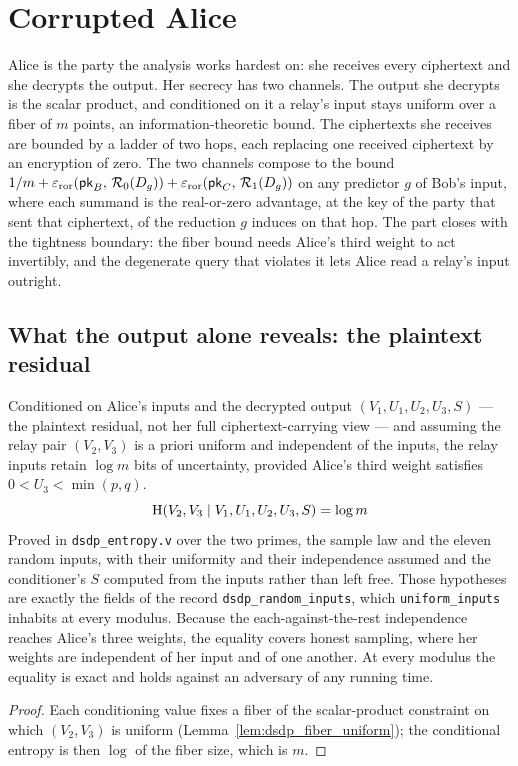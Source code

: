 \part{Corrupted Alice}

Alice is the party the analysis works hardest on: she receives every ciphertext
and she decrypts the output. Her secrecy has two channels. The output she decrypts
is the scalar product, and conditioned on it a relay's input stays uniform over a
fiber of $m$ points, an information-theoretic bound. The ciphertexts she receives
are bounded by a ladder of two hops, each replacing one received ciphertext by an
encryption of zero. The two channels compose to the bound
$1/m + \varepsilon_{\mathrm{ror}}(\mathsf{pk}_B,\,\mathcal{R}_{0}(D_g)) + \varepsilon_{\mathrm{ror}}(\mathsf{pk}_C,\,\mathcal{R}_{1}(D_g))$ on any predictor $g$ of Bob's input, where each summand is
the real-or-zero advantage, at the key of the party that sent that ciphertext, of
the reduction $g$ induces on that hop. The part closes with the tightness
boundary: the fiber bound needs Alice's third weight to act invertibly, and the
degenerate query that violates it lets Alice read a relay's input outright.

\chapter{What the output alone reveals: the plaintext residual}

\begin{theorem}
  \label{thm:dsdp_centropy_uniform}
  \rocqok
  Conditioned on Alice's inputs and the decrypted output $(V_1,U_1,U_2,U_3,S)$ ---
  the plaintext residual, not her full ciphertext-carrying view --- and assuming
  the relay pair $(V_2,V_3)$ is a priori uniform and independent of the inputs, the
  relay inputs retain $\log m$ bits of uncertainty, provided Alice's third weight
  satisfies $0 < U_3 < \min(p,q)$.
  \[ \mathrm{H}(V_2, V_3 \mid V_1,U_1,U_2,U_3,S) = \log m \]
  Proved in \texttt{dsdp\_entropy.v} over the two primes, the sample law and
  the eleven random inputs, with their uniformity and their independence
  assumed and the conditioner's $S$ computed from the inputs rather than left
  free. Those hypotheses are exactly the fields of the record
  \texttt{dsdp\_random\_inputs}, which \texttt{uniform\_inputs} inhabits at
  every modulus. Because the each-against-the-rest independence reaches
  Alice's three weights, the equality covers honest sampling, where her
  weights are independent of her input and of one another. At
  every modulus the equality is exact and holds against an adversary of any
  running time.
\end{theorem}
\begin{proof}
  \rocqok
  Each conditioning value fixes a fiber of the scalar-product constraint on which
  $(V_2,V_3)$ is uniform (Lemma~\ref{lem:dsdp_fiber_uniform}); the conditional
  entropy is then $\log$ of the fiber size, which is $m$.
\end{proof}

